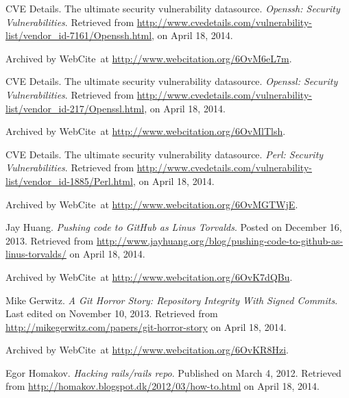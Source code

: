 \begin{thebibliography}{9}

CVE Details. The ultimate security vulnerability datasource. \emph{Openssh:
Security Vulnerabilities}. Retrieved from
\url{http://www.cvedetails.com/vulnerability-list/vendor_id-7161/Openssh.html},
on April 18, 2014.

Archived by WebCite\textsuperscript{\textregistered}\ at
\url{http://www.webcitation.org/6OvM6eL7m}.


CVE Details. The ultimate security vulnerability datasource. \emph{Openssl:
Security Vulnerabilities}. Retrieved from
\url{http://www.cvedetails.com/vulnerability-list/vendor_id-217/Openssl.html},
on April 18, 2014.

Archived by WebCite\textsuperscript{\textregistered}\ at
\url{http://www.webcitation.org/6OvMlTlsh}.


CVE Details. The ultimate security vulnerability datasource. \emph{Perl:
Security Vulnerabilities}. Retrieved from
\url{http://www.cvedetails.com/vulnerability-list/vendor_id-1885/Perl.html}, on
April 18, 2014.

Archived by WebCite\textsuperscript{\textregistered}\ at
\url{http://www.webcitation.org/6OvMGTWjE}.


Jay Huang. \emph{Pushing code to GitHub as Linus Torvalds}. Posted on December
16, 2013. Retrieved from
\url{http://www.jayhuang.org/blog/pushing-code-to-github-as-linus-torvalds/} on
April 18, 2014.

Archived by WebCite\textsuperscript{\textregistered}\ at
\url{http://www.webcitation.org/6OvK7dQBu}.


Mike Gerwitz. \emph{A Git Horror Story: Repository Integrity With Signed
Commits}. Last edited on November 10, 2013. Retrieved from
\url{http://mikegerwitz.com/papers/git-horror-story} on April 18, 2014.

Archived by WebCite\textsuperscript{\textregistered}\ at
\url{http://www.webcitation.org/6OvKR8Hzi}.


Egor Homakov. \emph{Hacking rails/rails repo}. Published on March 4, 2012.
Retrieved from \url{http://homakov.blogspot.dk/2012/03/how-to.html} on April
18, 2014.


\end{thebibliography}
